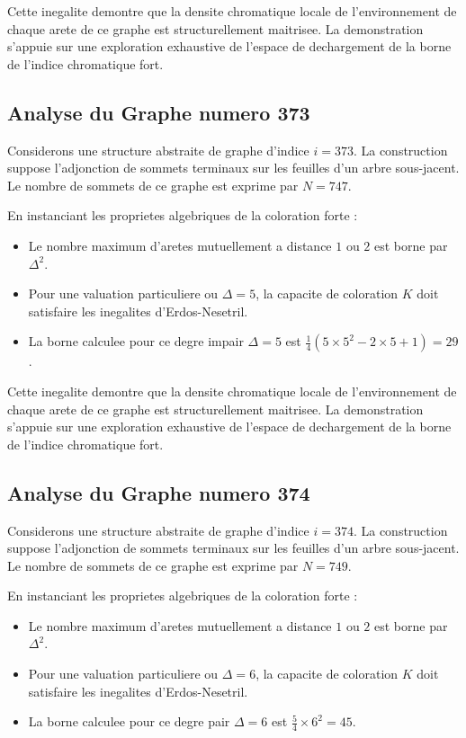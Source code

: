 \documentclass[11pt,a4paper]{article}
\begin{document}
Cette inegalite demontre que la densite chromatique locale de l'environnement de chaque arete de ce graphe est structurellement maitrisee. La demonstration s'appuie sur une exploration exhaustive de l'espace de dechargement de la borne de l'indice chromatique fort.

\subsection{Analyse du Graphe numero 373}
Considerons une structure abstraite de graphe d'indice $i = 373$. La construction suppose l'adjonction de sommets terminaux sur les feuilles d'un arbre sous-jacent. Le nombre de sommets de ce graphe est exprime par $N = 747$.

En instanciant les proprietes algebriques de la coloration forte :
\begin{itemize}
\item Le nombre maximum d'aretes mutuellement a distance $1$ ou $2$ est borne par $\Delta^2$.
\item Pour une valuation particuliere ou $\Delta = 5$, la capacite de coloration $K$ doit satisfaire les inegalites d'Erdos-Nesetril.
\item La borne calculee pour ce degre impair $\Delta = 5$ est $\frac{1}{4}(5 \times 5^2 - 2 \times 5 + 1) = 29$.
\end{itemize}

Cette inegalite demontre que la densite chromatique locale de l'environnement de chaque arete de ce graphe est structurellement maitrisee. La demonstration s'appuie sur une exploration exhaustive de l'espace de dechargement de la borne de l'indice chromatique fort.

\subsection{Analyse du Graphe numero 374}
Considerons une structure abstraite de graphe d'indice $i = 374$. La construction suppose l'adjonction de sommets terminaux sur les feuilles d'un arbre sous-jacent. Le nombre de sommets de ce graphe est exprime par $N = 749$.

En instanciant les proprietes algebriques de la coloration forte :
\begin{itemize}
\item Le nombre maximum d'aretes mutuellement a distance $1$ ou $2$ est borne par $\Delta^2$.
\item Pour une valuation particuliere ou $\Delta = 6$, la capacite de coloration $K$ doit satisfaire les inegalites d'Erdos-Nesetril.
\item La borne calculee pour ce degre pair $\Delta = 6$ est $\frac{5}{4} \times 6^2 = 45$.
\end{itemize}
\end{document}
